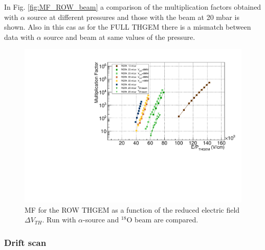 \documentclass[a4paper, 11 pt]{report}
\newcommand{\Vthgem}{$\Delta V_{TH}$}
\begin{document}
  In Fig. \ref{fig:MF_ROW_beam} a comparison of the multiplication factors obtained with
  $\alpha$ source at different pressures and those with the beam at 20 mbar is shown. Also in this
  cas as for the FULL THGEM there is a mismatch between data with $\alpha$ source and
  beam at same values of the pressure.

  \begin{figure}[htbp]
	\centering						  
	\includegraphics[width=\textwidth]{Immagini/MF_ROW_THGEM_withBeam_F.pdf}
	\caption{MF for the ROW THGEM as a function of the reduced electric field \Vthgem{}. Run with 
	$\alpha$-source	and $^{18}$O beam are compared. }
	\label{fig:MF_ALL_beam}
  \end{figure}

  \clearpage
  \subsubsection{Drift scan}
\end{document}
